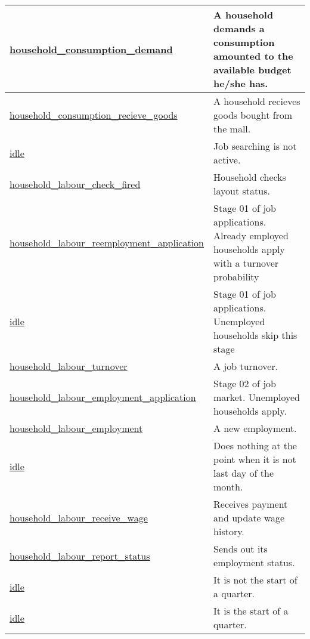 \documentclass[a4paper,11pt]{article}
\begin{document}
\begin{longtable}[H!]{ll}
\midrule
\parbox{5cm}{\url{household_consumption_demand}}  & \parbox{10cm}{A household demands a consumption amounted to the available budget he/she has.} \\
\midrule
\parbox{5cm}{\url{household_consumption_recieve_goods}}  & \parbox{10cm}{A household recieves goods bought from the mall.} \\
\midrule
\parbox{5cm}{\url{idle}}  & \parbox{10cm}{Job searching is not active.} \\
\midrule
\parbox{5cm}{\url{household_labour_check_fired}}  & \parbox{10cm}{Household checks layout status.} \\
\midrule
\parbox{5cm}{\url{household_labour_reemployment_application}}  & \parbox{10cm}{Stage 01 of job applications. Already employed households apply with a turnover probability} \\
\midrule
\parbox{5cm}{\url{idle}}  & \parbox{10cm}{Stage 01 of job applications. Unemployed households skip this stage} \\
\midrule
\parbox{5cm}{\url{household_labour_turnover}}  & \parbox{10cm}{A job turnover.} \\
\midrule
\parbox{5cm}{\url{household_labour_employment_application}}  & \parbox{10cm}{Stage 02 of job market. Unemployed households apply.} \\
\midrule
\parbox{5cm}{\url{household_labour_employment}}  & \parbox{10cm}{A new employment.} \\
\midrule
\parbox{5cm}{\url{idle}}  & \parbox{10cm}{Does nothing at the point when it is not last day of the month.} \\
\midrule
\parbox{5cm}{\url{household_labour_receive_wage}}  & \parbox{10cm}{Receives payment and update wage history.} \\
\midrule
\parbox{5cm}{\url{household_labour_report_status}}  & \parbox{10cm}{Sends out its employment status.} \\
\midrule
\parbox{5cm}{\url{idle}}  & \parbox{10cm}{It is not the start of a quarter.} \\
\midrule
\parbox{5cm}{\url{idle}}  & \parbox{10cm}{It is the start of a quarter.} \\

\end{longtable}
\end{document}
